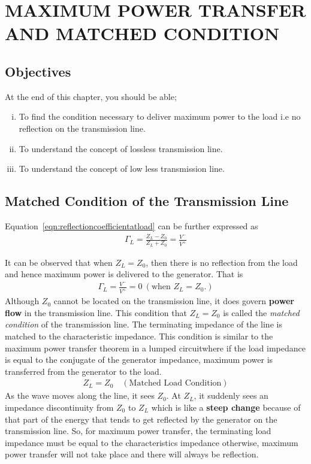\chapter{MAXIMUM POWER TRANSFER AND MATCHED CONDITION}


\begin{mdframed}[backgroundcolor=lightblue, linewidth=1pt, hidealllines=true]
\section{Objectives}
At the end of this chapter, you should be able;
\begin{enumerate}[(i)]
		\item To find the condition necessary to deliver maximum power to the load i.e no reflection on the transmission line.
		\item To understand the concept of lossless transmission line.
		\item To understand the concept of low less transmission line.
\end{enumerate}
\end{mdframed}

\section{Matched Condition of the Transmission Line}\label{lec:lec4}
Equation~\eqref{eqn:reflectioncoefficientatload} can be further expressed as
\begin{align*}
\Gamma_L = \frac{Z_L - Z_0}{Z_L + Z_0} = \frac{V^-}{V^+}
\end{align*}

It can be observed that when $Z_L = Z_0$, then there is no reflection from the load and hence maximum power is delivered to the generator. That is
\begin{align*}
\Gamma_L = \frac{V^-}{V^+} = 0\ (\text{when }Z_L = Z_0.) 
\end{align*}
Although $Z_0$ cannot be located on the transmission line, it does govern\textbf{ power flow} in the transmission line. This condition that $Z_L = Z_0$ is called the \emph{matched condition} of the transmission line. The terminating impedance of the line is matched to the characteristic impedance. This condition is similar to the maximum power transfer theorem in a lumped circuit\textemdash\;where if the load impedance is equal to the conjugate of the generator impedance, maximum power is transferred from the generator to the load.
\begin{align*}
Z_L = Z_0 \quad (\text{Matched Load Condition})
\end{align*}
As the wave moves along the line, it sees $Z_0$. At $Z_L$, it suddenly sees an impedance discontinuity from $Z_0$ to $Z_L$ which is like a \textbf{steep change} because of that part of the energy that tends to get reflected by the generator on the transmission line. So, for maximum power transfer, the terminating load impedance must be equal to the characteristics impedance otherwise, maximum power transfer will not take place and there will always be reflection.

